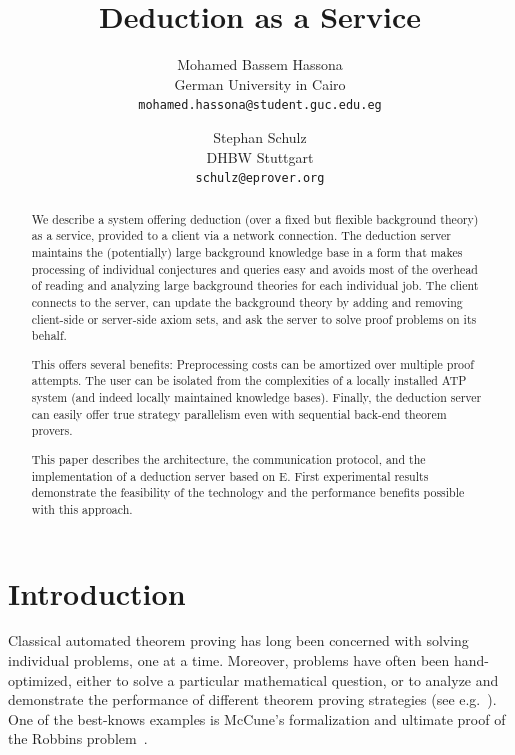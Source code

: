 \documentclass{article}
\title{Deduction as a Service}
\author{Mohamed Bassem Hassona\\German University in Cairo\\
{\small \tt mohamed.hassona@student.guc.edu.eg}
\and
Stephan Schulz\\DHBW Stuttgart\\{\small \tt schulz@eprover.org}}
\date{}
\begin{document}


\maketitle

\begin{abstract}
  We describe a system offering deduction (over a fixed but flexible
  background theory) as a service, provided to a client via a network
  connection. The deduction server maintains the (potentially) large
  background knowledge base in a form that makes processing of
  individual conjectures and queries easy and avoids most of the
  overhead of reading and analyzing large background theories for each
  individual job. The client connects to the server, can update the
  background theory by adding and removing client-side or server-side
  axiom sets, and ask the server to solve proof problems on its
  behalf.

  This offers several benefits: Preprocessing costs can be amortized
  over multiple proof attempts. The user can be isolated from the
  complexities of a locally installed ATP system (and indeed locally
  maintained knowledge bases). Finally, the deduction server can
  easily offer true strategy parallelism even with sequential back-end
  theorem provers.

  This paper describes the architecture, the communication protocol,
  and the implementation of a deduction server based on E. First
  experimental results demonstrate the feasibility of the technology
  and the performance benefits possible with this approach.
\end{abstract}

\section{Introduction}
\label{sec:intro}

Classical automated theorem proving has long been concerned with
solving individual problems, one at a time. Moreover, problems have
often been hand-optimized, either to solve a particular mathematical
question, or to analyze and demonstrate the performance of different
theorem proving strategies (see e.g.~\cite{McCune:Wos-1997}). One of
the best-knows examples is McCune's formalization and ultimate proof of
the Robbins problem~\cite{McCune:JAR-1997}.
\end{document}
